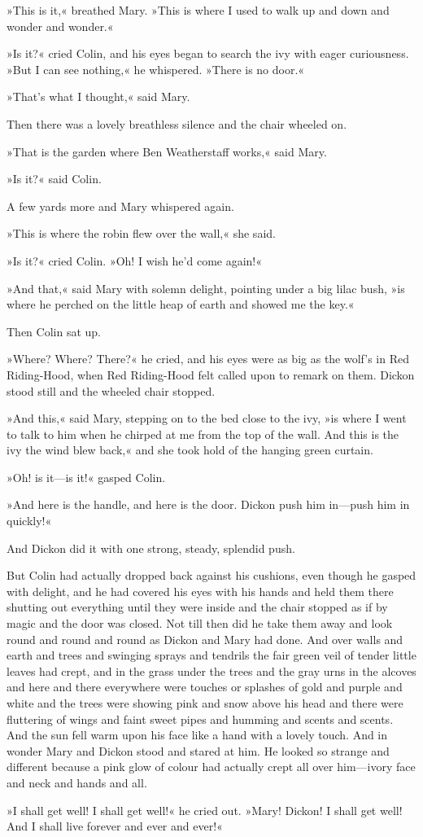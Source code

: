 »This is it,« breathed Mary. »This is where I used to walk up and down and wonder and wonder.«

»Is it?« cried Colin, and his eyes began to search the ivy with eager curiousness. »But I can see nothing,« he whispered. »There is no door.«

»That's what I thought,« said Mary.

Then there was a lovely breathless silence and the chair wheeled on.

»That is the garden where Ben Weatherstaff works,« said Mary.

»Is it?« said Colin.

A few yards more and Mary whispered again.

»This is where the robin flew over the wall,« she said.

»Is it?« cried Colin. »Oh! I wish he'd come again!«

»And that,« said Mary with solemn delight, pointing under a big lilac bush, »is where he perched on the little heap of earth and showed me the key.«

Then Colin sat up.

»Where? Where? There?« he cried, and his eyes were as big as the wolf's in Red Riding-Hood, when Red Riding-Hood felt called upon to remark on them. Dickon stood still and the wheeled chair stopped.

»And this,« said Mary, stepping on to the bed close to the ivy, »is where I went to talk to him when he chirped at me from the top of the wall. And this is the ivy the wind blew back,« and she took hold of the hanging green curtain.

»Oh! is it—is it!« gasped Colin.

»And here is the handle, and here is the door. Dickon push him in—push him in quickly!«

And Dickon did it with one strong, steady, splendid push.

But Colin had actually dropped back against his cushions, even though he gasped with delight, and he had covered his eyes with his hands and held them there shutting out everything until they were inside and the chair stopped as if by magic and the door was closed. Not till then did he take them away and look round and round and round as Dickon and Mary had done. And over walls and earth and trees and swinging sprays and tendrils the fair green veil of tender little leaves had crept, and in the grass under the trees and the gray urns in the alcoves and here and there everywhere were touches or splashes of gold and purple and white and the trees were showing pink and snow above his head and there were fluttering of wings and faint sweet pipes and humming and scents and scents. And the sun fell warm upon his face like a hand with a lovely touch. And in wonder Mary and Dickon stood and stared at him. He looked so strange and different because a pink glow of colour had actually crept all over him—ivory face and neck and hands and all.

»I shall get well! I shall get well!« he cried out. »Mary! Dickon! I shall get well! And I shall live forever and ever and ever!«